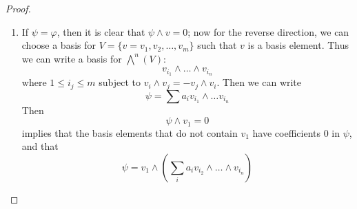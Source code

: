 \documentclass[openany]{book}
\begin{document}
\begin{proof}
    \begin{enumerate}
        \item If $\psi=\varphi$, then it is clear that $\psi\wedge v=0$; now for the reverse direction, we can choose a basis for $V=\{v=v_1, v_2, \dots, v_{m}\}$ such that $v$ is a basis element. Thus we can write a basis for $\bigwedge^n(V)$:
        \begin{equation*}
            v_{i_1}\wedge\dots\wedge v_{i_n}
        \end{equation*}
        where $1\leq i_j\leq m$ subject to $v_i\wedge v_j=-v_j\wedge v_i$. Then we can write
        \begin{equation*}
            \psi=\sum a_{i}v_{i_1}\wedge\dots v_{i_n}
        \end{equation*}
        Then 
        \begin{equation*}
            \psi\wedge v_1=0
        \end{equation*}
        implies that the basis elements that do not contain $v_1$ have coefficients $0$ in $\psi$, and that 
        \begin{equation*}
            \psi=v_1\wedge\left(\sum_ia_i v_{i_2}\wedge\dots\wedge v_{i_n}\right)
        \end{equation*}

        
        
        
        
        
        
        
        
        
        
        
        
        

\end{enumerate}
\end{proof}
\end{document}
